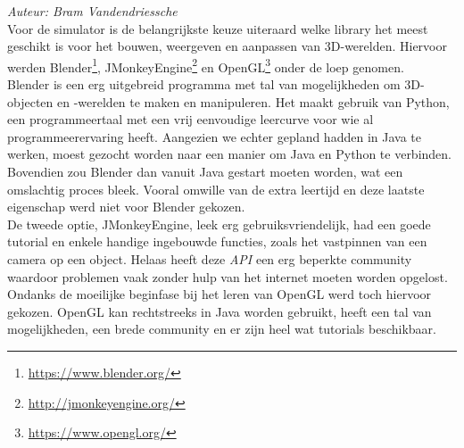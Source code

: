 {\em Auteur: Bram Vandendriessche}\\


\noindent
Voor de simulator is de belangrijkste keuze uiteraard welke library het meest geschikt is voor het bouwen, weergeven en aanpassen van 3D-werelden. Hiervoor werden Blender\footnote{\url{https://www.blender.org/}}, JMonkeyEngine\footnote{\url{http://jmonkeyengine.org/}} en OpenGL\footnote{\url{https://www.opengl.org/}} onder de loep genomen. 
\\
Blender is een erg uitgebreid programma met tal van mogelijkheden om 3D-objecten en -werelden te maken en manipuleren. Het maakt gebruik van Python, een programmeertaal met een vrij eenvoudige leercurve voor wie al programmeerervaring heeft. Aangezien we echter gepland hadden in Java te werken, moest gezocht worden naar een manier om Java en Python te verbinden. Bovendien zou Blender dan vanuit Java gestart moeten worden, wat een omslachtig proces bleek. Vooral omwille van de extra leertijd en deze laatste eigenschap werd niet voor Blender gekozen. \\
De tweede optie, JMonkeyEngine, leek erg gebruiksvriendelijk, had een goede tutorial en enkele handige ingebouwde functies, zoals het vastpinnen van een camera op een object. Helaas heeft deze \textit{API} een erg beperkte community waardoor problemen vaak zonder hulp van het internet moeten worden opgelost. 
\\
Ondanks de moeilijke beginfase bij het leren van OpenGL werd toch hiervoor gekozen. OpenGL kan rechtstreeks in Java worden gebruikt, heeft een tal van mogelijkheden, een brede community en er zijn heel wat tutorials beschikbaar. 



